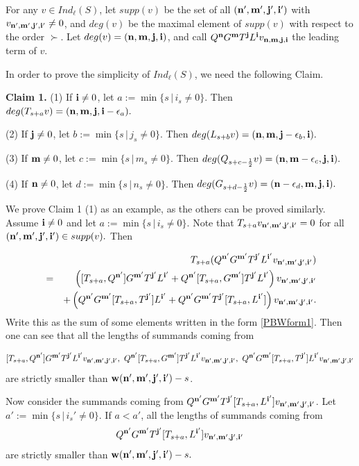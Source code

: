 \documentclass[12pt]{article}
\numberwithin{equation}{section}
\begin{document}
For any $v\in Ind_\ell(S)$, let $supp(v)$ be the set of all $({\bf n',m',j',i'})$ with $v_{{\bf n',m',j',i'}}\ne 0$, and $deg(v)$ be the maximal element of $supp(v)$ with respect to the  order $\succ$.  Let $deg(v)=({\bf n,m,j,i})$, and call $Q^{\bf n}G^{\bf m}T^{\bf j}L^{\bf i}v_{\bf n,m,j,i}$ the leading term of $v$.

In order to prove the simplicity of $Ind_\ell(S)$, we need the following Claim.




{\bf Claim 1.} (1) If ${\bf i}\ne 0$, let $a:=\min\{s\,|\,i_s\ne 0\}.$ Then $deg(T_{s+a}v)=({\bf n,m,j,i}-\epsilon_a).$

(2) If $ {\bf j}\ne 0$, let $b:=\min\{s\,|\,j_s\ne 0\}.$ Then  $deg(L_{s+b}v)=({\bf n,m,j}-\epsilon_b,{\bf i}).$

(3) If ${\bf m}\ne 0$, let $c:=\min\{s\,|\,m_s\ne 0\}.$ Then $deg(Q_{s+c-\frac{1}{2}}v)=({\bf n,m}-\epsilon_c,{\bf j,i}).$

(4) If $ {\bf n}\ne 0$, let $d:=\min\{s\,|\,n_s\ne 0\}.$ Then $deg(G_{s+d-\frac{1}{2}}v)=({\bf n}-\epsilon_d,{\bf m,j,i}).$

We prove Claim 1 (1) as an example, as the others can be proved similarly. Assume  ${\bf i}\ne 0$ and  let $a:=\min\{s\,|\,i_s\ne 0\}.$
 Note that $T_{s+a}v_{\bf n',m',j',i'}=0$ for all $({\bf n',m',j',i'})\in supp(v).$ Then

\begin{eqnarray*}&&T_{s+a}(Q^{\bf n'}G^{\bf m'}T^{\bf j'}L^{\bf i'}v_{\bf n',m',j',i'})\\
&=&\left([T_{s+a},Q^{\bf n'}]G^{\bf m'}T^{\bf j'}L^{\bf i'}+Q^{\bf n'}[T_{s+a},G^{\bf m'}]T^{\bf j'}L^{\bf i'}\right)v_{\bf n',m',j',i'}\\
&&+\left(Q^{\bf n'}G^{\bf m'}[T_{s+a},T^{\bf j'}]L^{\bf i'}+Q^{\bf n'}G^{\bf m'}T^{\bf j'}[T_{s+a},L^{\bf i'}]\right)v_{\bf n',m',j',i'}.
\end{eqnarray*}
Write this as the sum of some elements written in the form \eqref{PBWform1}. Then one can see that all
the lengths of summands coming from

$$[T_{s+a},Q^{\bf n'}]G^{\bf m'}T^{\bf j'}L^{\bf i'}v_{\bf n',m',j',i'},\ Q^{\bf n'}[T_{s+a},G^{\bf m'}]T^{\bf j'}L^{\bf i'}v_{\bf n',m',j',i'},\ Q^{\bf n'}G^{\bf m'}[T_{s+a},T^{\bf j'}]L^{\bf i'}v_{\bf n',m',j',i'}$$ are strictly smaller than ${\bf w(n',m',j',i')}-s$.

Now consider the summands coming from $Q^{\bf n'}G^{\bf m'}T^{\bf j'}[T_{s+a},L^{\bf i'}]v_{\bf n',m',j',i'}$. Let  $a':=\min\{s\,|\,i_s'\ne 0\}.$   If $a<a'$, all the lengths of summands coming from
$$Q^{\bf n'}G^{\bf m'}T^{\bf j'}[T_{s+a},L^{\bf i'}]v_{\bf n',m',j',i'}$$ are strictly smaller than ${\bf w(n',m',j',i')}-s.$
\end{document}
